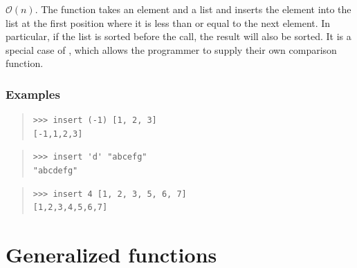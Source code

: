 \begin{haddockdesc}
\item[\begin{tabular}{@{}l}
insert :: Ord a => a -> {\char 91}a{\char 93} -> {\char 91}a{\char 93}
\end{tabular}]
{\haddockbegindoc
\(\mathcal{O}(n)\). The  function takes an element and a list and
 inserts the element into the list at the first position where it is less than
 or equal to the next element. In particular, if the list is sorted before the
 call, the result will also be sorted. It is a special case of ,
 which allows the programmer to supply their own comparison function.\par
\subsubsection*{\textbf{Examples}}
\begin{quote}
{\haddockverb\begin{verbatim}
>>> insert (-1) [1, 2, 3]
[-1,1,2,3]

\end{verbatim}}
\end{quote}
\begin{quote}
{\haddockverb\begin{verbatim}
>>> insert 'd' "abcefg"
"abcdefg"

\end{verbatim}}
\end{quote}
\begin{quote}
{\haddockverb\begin{verbatim}
>>> insert 4 [1, 2, 3, 5, 6, 7]
[1,2,3,4,5,6,7]

\end{verbatim}}
\end{quote}}
\end{haddockdesc}
\section{Generalized functions}
